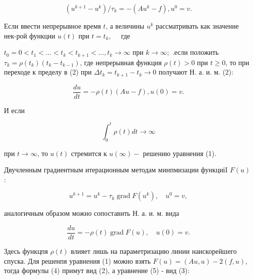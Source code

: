\documentclass[10pt]{article}
\begin{document}
\[

\left(u^{k+1}-u^{k}\right) / \tau_{k}=-\left(A u^{k}-f\right), u^{0}=v .

\]



Если ввести непрерывное время $t$, а величины $u^{k}$ рассматривать как значение нек-рой функции $u(t)$ при $t=t_{k}, \quad$ где



$t_{0}=0<t_{1}<\ldots<t_{k}<t_{k+1}<\ldots, t_{k} \rightarrow \infty$ при $k \rightarrow \infty ;$ .если положить $\tau_{k}=\rho\left(t_{k}\right)\left(t_{k}-t_{k-1}\right)$, где непрерывная функция $\rho(t)>0$ при $t \geqslant 0$, то при переходе к пределу в (2) при $\Delta t_{k}=t_{k+1}-t_{k} \rightarrow 0$ получают Н. а. и. м. (2):



\[

\frac{d u}{d t}=-\rho(t)(A u-f), u(0)=v .

\]



И если



\[

\int_{0}^{t} \rho(t) d t \rightarrow \infty

\]



при $t \rightarrow \infty$, то $u(t)$ стремится к $u(\infty)-$ решению уравнения (1).



Двучленным градиентным итерационным методам минпмизации функциіI $F(u)$ :



\[

u^{k+1}=u^{k}-\tau_{k} \operatorname{grad} F\left(u^{k}\right), \quad u^{0}=v,

\]



аналогичным образом можно сопоставить Н. а. и. м. вида



\[

\frac{d u}{d t}=-\rho(t) \operatorname{grad} F(u), \quad u(0)=v .

\]



Здесь функцпя $\rho(t)$ влияет лишь на параметризацию линии наискорейшего спуска. Для решенпя уравнения (1) можно взять $F(u)=(A u, u)-2(f, u)$, тогда формулы (4) примут вид (2), а уравнение (5) - вид (3):
\end{document}
